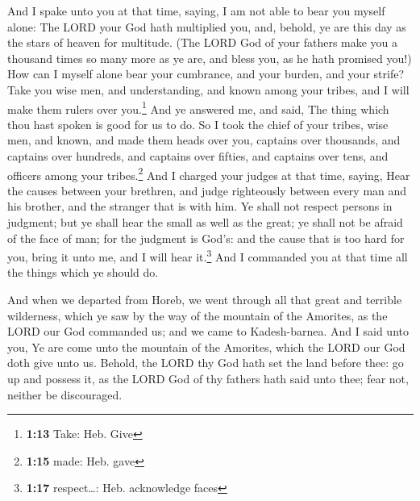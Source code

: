  And I spake unto you at that time, saying, I am not able
to bear you myself alone:  The LORD your God hath
multiplied you, and, behold, ye are this day as the stars of heaven for
multitude.  (The LORD God of your fathers make you a
thousand times so many more as ye are, and bless you, as he hath
promised you!)  How can I myself alone bear your
cumbrance, and your burden, and your strife?  Take you
wise men, and understanding, and known among your tribes, and I will
make them rulers over you.\footnote{\textbf{1:13} Take: Heb. Give}
 And ye answered me, and said, The thing which thou hast
spoken is good for us to do.  So I took the chief of your
tribes, wise men, and known, and made them heads over you, captains over
thousands, and captains over hundreds, and captains over fifties, and
captains over tens, and officers among your tribes.\footnote{\textbf{1:15}
  made: Heb. gave}  And I charged your judges at that
time, saying, Hear the causes between your brethren, and judge
righteously between every man and his brother, and the stranger that is
with him.  Ye shall not respect persons in judgment; but
ye shall hear the small as well as the great; ye shall not be afraid of
the face of man; for the judgment is God's: and the cause that is too
hard for you, bring it unto me, and I will hear it.\footnote{\textbf{1:17}
  respect\ldots: Heb. acknowledge faces}  And I commanded
you at that time all the things which ye should do.

 And when we departed from Horeb, we went through all
that great and terrible wilderness, which ye saw by the way of the
mountain of the Amorites, as the LORD our God commanded us; and we came
to Kadesh-barnea.  And I said unto you, Ye are come unto
the mountain of the Amorites, which the LORD our God doth give unto us.
 Behold, the LORD thy God hath set the land before thee:
go up and possess it, as the LORD God of thy fathers hath said unto
thee; fear not, neither be discouraged.

